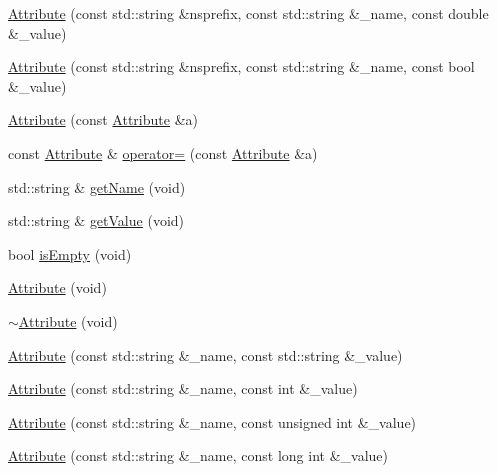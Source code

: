 \begin{DoxyCompactItemize}
\item 
\mbox{\hyperlink{classXMLWriterAPI_1_1Attribute_a501528e4f1a7b1cabeaf7cfc21c0b97d}{Attribute}} (const std\+::string \&nsprefix, const std\+::string \&\+\_\+name, const double \&\+\_\+value)
\item 
\mbox{\hyperlink{classXMLWriterAPI_1_1Attribute_ac570bd81cf851adca96d3b28eaa58c3e}{Attribute}} (const std\+::string \&nsprefix, const std\+::string \&\+\_\+name, const bool \&\+\_\+value)
\item 
\mbox{\hyperlink{classXMLWriterAPI_1_1Attribute_a44b71cf3ef8f67bb010561184f1678d1}{Attribute}} (const \mbox{\hyperlink{classXMLWriterAPI_1_1Attribute}{Attribute}} \&a)
\item 
const \mbox{\hyperlink{classXMLWriterAPI_1_1Attribute}{Attribute}} \& \mbox{\hyperlink{classXMLWriterAPI_1_1Attribute_a073917fc63e79e3f44d26c8a689d40e4}{operator=}} (const \mbox{\hyperlink{classXMLWriterAPI_1_1Attribute}{Attribute}} \&a)
\item 
std\+::string \& \mbox{\hyperlink{classXMLWriterAPI_1_1Attribute_a7ad56e533adb981e46f9373d1631388c}{get\+Name}} (void)
\item 
std\+::string \& \mbox{\hyperlink{classXMLWriterAPI_1_1Attribute_aed17d7d4a0c883d240090c7c42599854}{get\+Value}} (void)
\item 
bool \mbox{\hyperlink{classXMLWriterAPI_1_1Attribute_a5d51eb94811cbc00beb32d68af4ed1fe}{is\+Empty}} (void)
\item 
\mbox{\hyperlink{classXMLWriterAPI_1_1Attribute_a8e3ae0b3a50638884297229bbeea63a5}{Attribute}} (void)
\item 
\mbox{\hyperlink{classXMLWriterAPI_1_1Attribute_a0f46ffe1b2c523fab17e567825dd3ec3}{$\sim$\+Attribute}} (void)
\item 
\mbox{\hyperlink{classXMLWriterAPI_1_1Attribute_a0eb808fb230ba6a40ac9ee5334e86244}{Attribute}} (const std\+::string \&\+\_\+name, const std\+::string \&\+\_\+value)
\item 
\mbox{\hyperlink{classXMLWriterAPI_1_1Attribute_a4ea20cb88234ac7eb3aedc6971d7c649}{Attribute}} (const std\+::string \&\+\_\+name, const int \&\+\_\+value)
\item 
\mbox{\hyperlink{classXMLWriterAPI_1_1Attribute_ac147b4b673ad76a63fa60b5fba30ca24}{Attribute}} (const std\+::string \&\+\_\+name, const unsigned int \&\+\_\+value)
\item 
\mbox{\hyperlink{classXMLWriterAPI_1_1Attribute_a2ed766103f87670031137dc458d55f7b}{Attribute}} (const std\+::string \&\+\_\+name, const long int \&\+\_\+value)
\item 

\end{DoxyCompactItemize}
